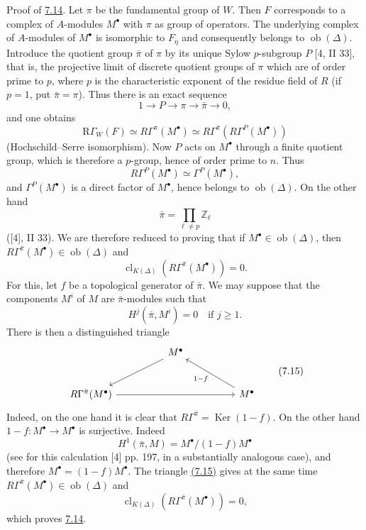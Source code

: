 \documentclass[11pt]{article}
\providecommand{\Ker}{\operatorname{Ker}}
\providecommand{\Ob}{\operatorname{ob}}
\providecommand{\Ker}{\operatorname{Ker}}
\providecommand{\Ker}{\operatorname{Ker}}
\providecommand{\Ob}{\operatorname{ob}}
\providecommand{\Ob}{\operatorname{Ob}}
\providecommand{\clK}[1]{\operatorname{cl}_{K(#1)}}
\providecommand{\RG}{\mathrm R\Gamma}
\providecommand{\Ob}{\operatorname{ob}}
\providecommand{\Ob}{\operatorname{Ob}}
\begin{document}
Proof of \hyperref[sga5:X:lemma:7.14]{7.14}. Let $\pi$ be the fundamental group of $W$. Then $F$ corresponds to a complex of $A$-modules $M^\bullet$ with $\pi$ as group of operators. The underlying complex of $A$-modules of $M^\bullet$ is isomorphic to $F_{\bar\eta}$ and consequently belongs to $\Ob(\Delta)$. Introduce the quotient group $\bar\pi$ of $\pi$ by its unique Sylow $p$-subgroup $P$ [4, II 33], that is, the projective limit of discrete quotient groups of $\pi$ which are of order prime to $p$, where $p$ is the characteristic exponent of the residue field of $R$ (if $p=1$, put $\bar\pi=\pi$). Thus there is an exact sequence
\[
1\longrightarrow P\longrightarrow \pi\longrightarrow \bar\pi\longrightarrow0,
\]
and one obtains
\[
\RG_W(F)\simeq R\Gamma^\pi(M^\bullet)
\simeq R\Gamma^{\bar\pi}(R\Gamma^P(M^\bullet))
\]
(Hochschild--Serre isomorphism). Now $P$ acts on $M^\bullet$ through a finite quotient group, which is therefore a $p$-group, hence of order prime to $n$. Thus
\[
R\Gamma^P(M^\bullet)\simeq \Gamma^P(M^\bullet),
\]
and $\Gamma^P(M^\bullet)$ is a direct factor of $M^\bullet$, hence belongs to $\Ob(\Delta)$. On the other hand
\[
\bar\pi=\prod_{\ell\ne p}\mathbb Z_\ell
\]
([4], II 33). We are therefore reduced to proving that if $M^\bullet\in\Ob(\Delta)$, then $R\Gamma^{\bar\pi}(M^\bullet)\in\Ob(\Delta)$ and
\[
\clK{\Delta}(R\Gamma^{\bar\pi}(M^\bullet))=0.
\]
For this, let $f$ be a topological generator of $\bar\pi$. We may suppose that the components $M^i$ of $M$ are $\bar\pi$-modules such that
\[
H^j(\bar\pi,M^i)=0\quad\text{if }j\ge1.
\]
There is then a distinguished triangle
\[
\begin{tikzcd}[column sep=huge,row sep=large]
& M^\bullet \arrow[dl] &\\
R\Gamma^{\bar\pi}(M^\bullet) \arrow[rr] && M^\bullet \arrow[ul,"1-f"]
\end{tikzcd}
\tag{7.15}\label{sga5:X:equation:7.15}
\]
Indeed, on the one hand it is clear that $R\Gamma^{\bar\pi}=\Ker(1-f)$. On the other hand $1-f:M^\bullet\to M^\bullet$ is surjective. Indeed
\[
H^1(\bar\pi,M)=M^\bullet/(1-f)M^\bullet
\]
(see for this calculation [4] pp. 197, in a substantially analogous case), and therefore $M^\bullet=(1-f)M^\bullet$. The triangle \hyperref[sga5:X:equation:7.15]{(7.15)} gives at the same time $R\Gamma^{\bar\pi}(M^\bullet)\in\Ob(\Delta)$ and
\[
\clK{\Delta}(R\Gamma^{\bar\pi}(M^\bullet))=0,
\]
which proves \hyperref[sga5:X:lemma:7.14]{7.14}.
\end{document}
